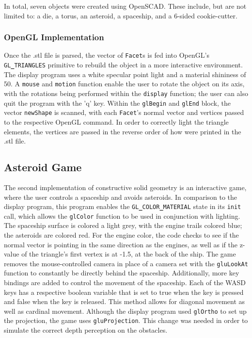 \documentclass[12pt]{article}
\begin{document}
\begin{doublespace}
In total, seven objects were created using OpenSCAD. These include, but are not limited to: a die, a torus, an asteroid, a spaceship, and a 6-sided cookie-cutter.
\subsubsection{OpenGL Implementation}
Once the .stl file is parsed, the vector of \texttt{Facet}s is fed into OpenGL's \texttt{GL{\bf\_}TRIANGLES} primitive to rebuild the object in a more interactive environment. The display program uses a white specular point light and a material shininess of 50. A \texttt{mouse} and \texttt{motion} function enable the user to rotate the object on its axis, with the rotations being performed within the \texttt{display} function; the user can also quit the program with the 'q' key. Within the \texttt{glBegin} and \texttt{glEnd} block, the vector \texttt{newShape} is scanned, with each \texttt{Facet}'s normal vector and vertices passed to the respective OpenGL command. In order to correctly light the triangle elements, the vertices are passed in the reverse order of how were printed in the .stl file.
\subsection{Asteroid Game}
The second implementation of constructive solid geometry is an interactive game, where the user controls a spaceship and avoids asteroids. In comparison to the display program, this program enables the \texttt{GL{\bf\_}COLOR{\bf\_}MATERIAL} state in its \texttt{init} call, which allows the \texttt{glColor} function to be used in conjunction with lighting. The spaceship surface is colored a light grey, with the engine trails colored blue; the asteroids are colored red. For the engine color, the code checks to see if the normal vector is pointing in the same direction as the engines, as well as if the z-value of the triangle's first vertex is at -1.5, at the back of the ship. The game removes the mouse-controlled camera in place of a camera set with the \texttt{gluLookAt} function to constantly be directly behind the spaceship. Additionally, more key bindings are added to control the movement of the spaceship. Each of the WASD keys has a respective boolean variable that is set to true when the key is pressed and false when the key is released. This method allows for diagonal movement as well as cardinal movement. Although the display program used \texttt{glOrtho} to set up the projection, the game uses \texttt{gluProjection}. This change was needed in order to simulate the correct depth perception on the obstacles.\\


\end{doublespace}
\end{document}
